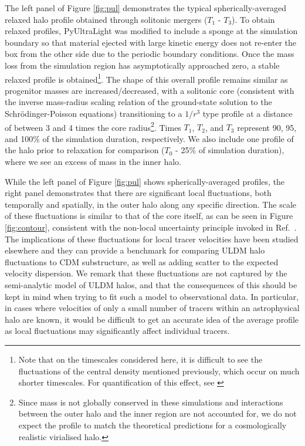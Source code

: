 \documentclass[a4paper,11pt]{article}
\begin{document}
The left panel of Figure \ref{fig:pul} demonstrates the typical spherically-averaged relaxed halo profile obtained through solitonic mergers ($T_1$ - $T_3$). To obtain relaxed profiles,
{\sc PyUltraLight} was modified to include a sponge at the simulation boundary so that material ejected with large kinetic energy does not re-enter the box from the other side due to the periodic boundary conditions. Once the mass loss from the simulation region has asymptotically approached zero, a stable relaxed profile is obtained\footnote{Note that on the timescales considered here, it is difficult to see the fluctuations of the central density mentioned previously, which occur on much shorter timescales. For quantification of this effect, see \cite{Veltmaat:2018dfz}}. The shape of this overall profile remains similar as progenitor masses are increased/decreased, with a solitonic core (consistent with the inverse mass-radius scaling relation of the ground-state solution to the Schr{\"o}dinger-Poisson equations) transitioning to a $1/r^3$ type profile at a distance of between 3 and 4 times the core radius\footnote{Since mass is not globally conserved in these simulations and interactions between the outer halo and the inner region are not accounted for, we do not expect the profile to match the theoretical predictions for a cosmologically realistic virialised halo.}. Times $T_1$, $T_2$, and $T_3$ represent 90, 95, and 100$\%$ of the simulation duration, respectively. We also include one profile of the halo prior to relaxation for comparison ($T_0$ - 25\% of simulation duration), where we see an excess of mass in the inner halo. 

While the left panel of Figure \ref{fig:pul} shows spherically-averaged profiles, the right panel demonstrates that there are significant local fluctuations, both temporally and spatially, in the outer halo along any specific direction. The scale of these fluctuations is similar to that of the core itself, as can be seen in Figure \ref{fig:contour}, consistent with the non-local uncertainty principle invoked in Ref.~\cite{Schive:2014hza}. The implications of these fluctuations for local tracer velocities have been studied elsewhere \cite{Marsh:2018zyw} and they can provide a benchmark for comparing ULDM halo fluctuations to CDM substructure, as well as adding scatter to the expected velocity dispersion. We remark that these fluctuations are not captured by the semi-analytic model of ULDM halos, and that the consequences of this should be kept in mind when trying to fit such a model to observational data. In particular, in cases where velocities of only a small number of tracers within an astrophysical halo are known, it would be difficult to get an accurate idea of the average profile as local fluctuations may significantly affect individual tracers. 
\end{document}
